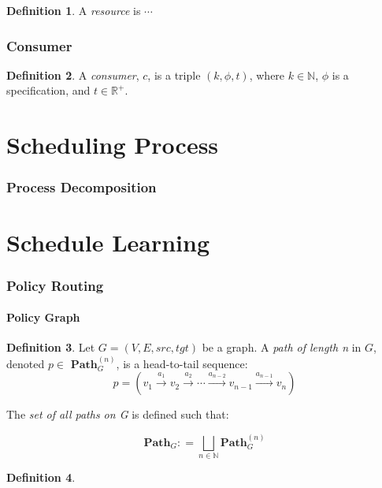 \documentclass{article}
\theoremstyle{definition}
\newtheorem{definition}{Definition}[section]
\theoremstyle{remark}
\theoremstyle{theorem}
\theoremstyle{definition}
\newcommand{\path}[2]{\mathbf{Path}^{#2}_{#1}}
\newcommand{\pathall}[1]{\mathbf{Path}_{#1}}
\newcommand{\labeledarrow}[1]{\stackrel{#1}{\rightarrow}}
\begin{document}
	\begin{definition}
		A \emph{resource} is $\cdots$
	\end{definition}
	
	\section{Consumer}
	
	\begin{definition}
		A \emph{consumer}, $c$, is a triple $(k, \phi, t)$, where $k \in \mathbb{N}$, $\phi$ is a specification, and $t \in \mathbb{R}^{+}$. 
	\end{definition}
	
	\part{Scheduling Process}
	
	\section{Process Decomposition}
	
	
	\part{Schedule Learning}
	
	\section{Policy Routing}
	
	\subsection{Policy Graph}
	
	\begin{definition}
		Let $G = (V, E, src, tgt)$ be a graph. A \emph{path of length n} in $G$, denoted $p \in$ $\path{G}{(n)}$, is a head-to-tail sequence:
		\[
		p = (v_{1}   \labeledarrow{a_{1}}   v_{2}   \labeledarrow{a_{2}}  \cdots   \labeledarrow{a_{n-2}}  v_{n-1}   \labeledarrow{a_{n-1}}   v_{n})
		\]
		
		The \emph{set of all paths on G} is defined such that: 
		
		\[
		\pathall{G} : = \bigsqcup_{n \in \mathbb{N}}{\path{G}{(n)}}
		\]
	\end{definition}

	\begin{definition}
		
	\end{definition}
	
		
	
\end{document}
